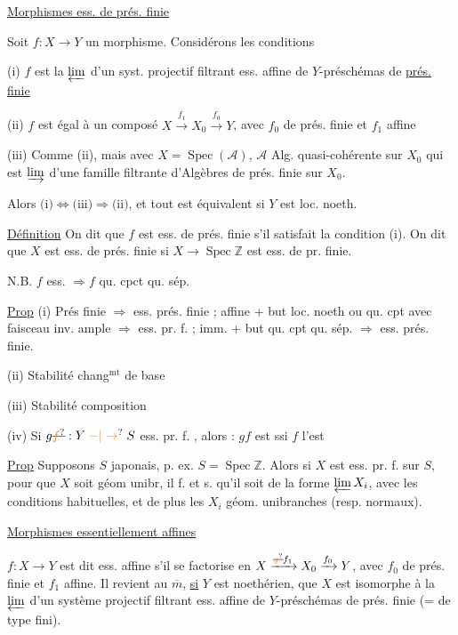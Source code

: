 \uline{Morphismes ess.  de prés. finie}

Soit $f:X\longrightarrow Y$ un morphisme. Considérons les conditions

(i) $f$ est la $\varprojlim$ d'un syst. projectif filtrant ess. affine de $Y$-préschémas de \uline{prés. finie}

(ii) $f$ est égal à un composé $X\xrightarrow{f_1}X_0\xrightarrow{f_0}Y$, avec $f_0$ de prés. finie et $f_1$ affine

(iii) Comme (ii), mais avec $X=\operatorname{Spec}(\mathcal A)$, $\mathcal A$ Alg. quasi-cohérente sur $X_0$ qui est $\varinjlim$ d'une famille filtrante d'Algèbres de prés. finie sur $X_0$.

Alors $\text{(i)}\Leftrightarrow\text{(iii)}\Longrightarrow\text{(ii)}$, et tout est équivalent si $Y$ est loc. noeth.

\uline{Définition} On dit que $f$ est ess. de prés. finie s'il satisfait la condition (i). On dit que $X$ est ess. de prés. finie si $X\longrightarrow\operatorname{Spec}\mathbb{Z}$ est ess. de pr. finie.

N.B.  $f$ ess.  $\Rightarrow f$ qu. cpct qu. sép.

\uline{Prop} (i) Prés finie $\Rightarrow$ ess. prés. finie ; affine + but loc. noeth ou qu. cpt  avec faisceau inv. ample $\Longrightarrow$ ess. pr. f. ;  imm.  + but qu. cpt qu. sép. $\Longrightarrow$ ess. prés. finie.

(ii) Stabilité chang$^{\mathrm{mt}}$ de base

(iii) Stabilité composition

(iv) Si $g\deleted{\unsure{f}}:Y\mathrel{\unsure{-|\to}}S$ ess. pr. f. , alors : $gf$  est  ssi $f$ l'est

\uline{Prop} Supposons $S$  japonais, p. ex. $S=\operatorname{Spec}\mathbb Z$. Alors si $X$ est  ess. pr. f. sur $S$, pour que $X$ soit géom unibr, il f. et s. qu'il soit de la forme $\varprojlim X_i$, avec les conditions habituelles, et de plus les $X_i$ géom. unibranches (resp. normaux).

\uline{Morphismes essentiellement affines}

$f:X\longrightarrow Y$ est dit ess. affine s'il se factorise en $X\xrightarrow{\deleted{\unsure{g}}f_1}X_0\xrightarrow{f_0}Y$, avec $f_0$ de prés. finie et $f_1$ affine. Il revient au $\overline m$, \uline{si} $Y$ est  noethérien, que $X$ est isomorphe à la $\varprojlim$ d'un système projectif filtrant  ess. affine de $Y$-préschémas de prés. finie (= de type fini).

